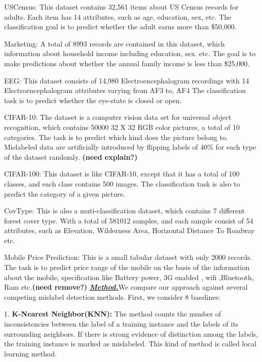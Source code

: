 \be
\item USCensus: This dataset contains 32,561 items about US Census records for adults. Each item has 14 attributes, such as age, education, sex, etc. The classification goal is to predict whether the adult earns more than \$50,000.
\item Marketing: A total of 8993 records are contained in this dataset, which information about household income including education, sex. etc. The goal is to make predictions about whether the annual family income is less than \$25,000. 
\item EEG: This dataset consists of 14,980 Electroencephalogram recordings with 14 Electroencephalogram attributes varying from AF3 to, AF4 The classification task is to predict whether the eye-state is closed or open. 
\item CIFAR-10: The dataset is a computer vision data set for universal object recognition, which contains 50000 32 X 32 RGB color pictures, a total of 10 categories. The task is to predict which kind does the picture belong to. Mislabeled data are artificially introduced by flipping labels of 40\% for each type of the dataset randomly. \textbf{(need explain?)}
\item CIFAR-100: This dataset is like CIFAR-10, except that it has a total of 100 classes, and each class contains 500 images. The classification task is also to predict the category of a given picture.
\item CovType: This is also a muti-classification dataset, which contains 7 different forest cover type. With a total of 581012 samples, and each sample consist of 54 attributes, such as Elevation, Wilderness Area, Horizontal Distance To Roadway etc.
\item Mobile Price Prediction: This is a small tabular dataset with only 2000 records. The task is to predict price range of the mobile on the basis of the information about the mobile, specification like Battery power, 3G enabled , wifi ,Bluetooth, Ram etc.\textbf{(need remove?)}
\ee
\textbf{\textit{\underline{Method.}}}We compare our approach against several competing mislabel detection methods. First, we consider 8 baselines:

1. \textbf{K-Nearest Neighbor(KNN):} The method counts the number of inconsistencies between the label of a training instance and the labels of its surrounding neighbors. If there is strong evidence of distinction among the labels, the training instance is marked as mislabeled. This kind of method is called local learning method.

